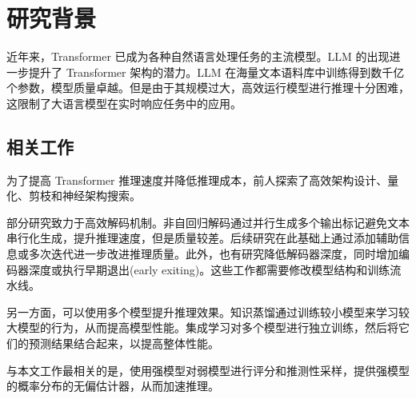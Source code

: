 \chapter{研究背景}

近年来，Transformer 已成为各种自然语言处理任务的主流模型。LLM 的出现进一步提升了 Transformer 架构的潜力。LLM 在海量文本语料库中训练得到数千亿个参数，模型质量卓越。但是由于其规模过大，高效运行模型进行推理十分困难，这限制了大语言模型在实时响应任务中的应用。

\section{相关工作}
为了提高 Transformer 推理速度并降低推理成本，前人探索了高效架构设计、量化、剪枝和神经架构搜索。

部分研究致力于高效解码机制。非自回归解码通过并行生成多个输出标记避免文本串行化生成，提升推理速度，但是质量较差。后续研究在此基础上通过添加辅助信息或多次迭代进一步改进推理质量。此外，也有研究降低解码器深度，同时增加编码器深度或执行早期退出(early exiting)。这些工作都需要修改模型结构和训练流水线。

另一方面，可以使用多个模型提升推理效果。知识蒸馏通过训练较小模型来学习较大模型的行为，从而提高模型性能。集成学习对多个模型进行独立训练，然后将它们的预测结果结合起来，以提高整体性能。

与本文工作最相关的是，使用强模型对弱模型进行评分和推测性采样，提供强模型的概率分布的无偏估计器，从而加速推理。
